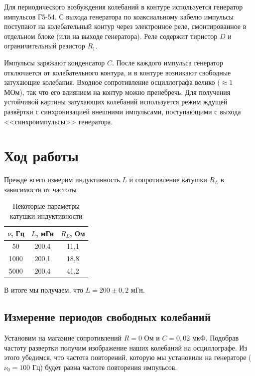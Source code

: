 \documentclass[a4paper, 12pt]{article}%
\begin{document}
Для периодического возбуждения колебаний в контуре используется генератор импульсов Г5-54. С выхода генератора по коаксиальному кабелю импульсы поступают на колебательный контур через электронное реле, смонтированное в отдельном блоке (или на выходе генератора). Реле содержит тиристор $D$ и ограничительный резистор $R_1$.

Импульсы заряжают конденсатор $C$. После каждого импульса генератор отключается от колебательного контура, и в контуре возникают свободные затухающие колебания. Входное сопротивление осциллографа велико ($\approx 1$ МОм), так что его влиянием на контур можно пренебречь. Для получения устойчивой картины затухающих колебаний используется режим ждущей развёртки с синхронизацией внешними импульсами, поступающими с выхода <<синхроимпульсы>> генератора.
\section*{Ход работы}
Прежде всего измерим индуктивность $L$ и сопротивление катушки $R_L$ в зависимости от частоты 

\begin{table}[h!]
\begin{center}

\begin{tabular}{|c|c|c|}
\hline
$\nu$, Гц & $L$, мГн & $R_L$, Ом \\ \hline
50        & 200,4    & 11,1      \\ \hline
1000      & 200,1    & 18,8      \\ \hline
5000      & 200,4    & 41,2      \\ \hline
\end{tabular}
\caption{Некоторые параметры катушки индуктивности}
\end{center}
\end{table}
В итоге мы получаем, что $L = 200 \pm 0,2$ мГн.
\newpage
\subsection*{Измерение периодов свободных колебаний}
Установим на магазине сопротивлений $R = 0$ Ом и $C = 0,02$ мкФ. Подобрав частоту развертки получим изображение наших колебаний на осциллографе. Из этого убедимся, что частота повторений, которую мы установили на генераторе ($\nu_0 = 100$ Гц) будет равна частоте повторения импульсов. 
\end{document}
